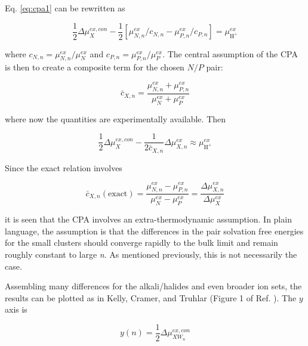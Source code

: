 \begin{cpa}
  Eq. \ref{eq:cpa1} can be rewritten as
  
  \begin{equation}
    \frac{1}{2} \Delta \mu_{X}^{ex,con} - \frac{1}{2} \left[ \mu_{N,n}^{ex}/c_{N,n} - \mu_{P,n}^{ex}/c_{P,n} \right] = \mu^{ex}_{\mathrm{H}^+}
    \label{eq:cpa3}
  \end{equation}
  
  \noindent where $c_{N,n} = \mu_{N,n}^{ex}/\mu_{N}^{ex}$ and $c_{P,n} = \mu_{P,n}^{ex}/\mu_{P}^{ex}$. The central assumption of the 
  CPA\cite{coe1998cpa1} is then to create a composite term for the chosen $N/P$ pair:

  \begin{equation}
    \bar{c}_{X,n} = \frac{\mu_{N,n}^{ex} + \mu_{P,n}^{ex}}{\mu_{N}^{ex} + \mu_{P}^{ex}}
    \label{eq:cpacomp}
  \end{equation}
  
  \noindent where now the quantities are experimentally available. Then

  \begin{equation}
    \frac{1}{2} \Delta \mu_{X}^{ex,con} - \frac{1}{2\bar{c}_{X,n}} \Delta \mu_{X,n}^{ex} \approx \mu^{ex}_{\mathrm{H}^+}
    \label{eq:cpafinal}
  \end{equation}
  
  \noindent Since the exact relation involves 
  
  \begin{equation} 
    \bar{c}_{X,n} (\mathrm{exact}) = \frac{\mu_{N,n}^{ex} - \mu_{P,n}^{ex}}{\mu_{N}^{ex} - \mu_{P}^{ex}} = \frac{\Delta \mu^{ex}_{X,n}}{\Delta \mu^{ex}_{X}}
    \label{eq:cpacompex}
  \end{equation}

  \noindent it is seen that the CPA involves an extra-thermodynamic assumption. In plain language, the assumption is that the differences
  in the pair solvation free energies for the small clusters should converge rapidly to the bulk limit and remain roughly constant to
  large \emph{n}. As mentioned previously, this is not necessarily the case\cite{donald2010expand_cpa,vlcek2013cpa,vlcek2016cpareview}.
 
  Assembling many differences for the alkali/halides and even broader ion sets, the results can be plotted as in Kelly, Cramer, and 
  Truhlar\cite{kelly2006cpa} (Figure 1 of Ref. \cite{kelly2006cpa}). The $y$ axis is 
  
  \begin{equation}
    y(n)=\frac{1}{2} \Delta \mu_{XW_n}^{ex,con}
    \label{eq:ydata}
  \end{equation}
  

\end{cpa}
